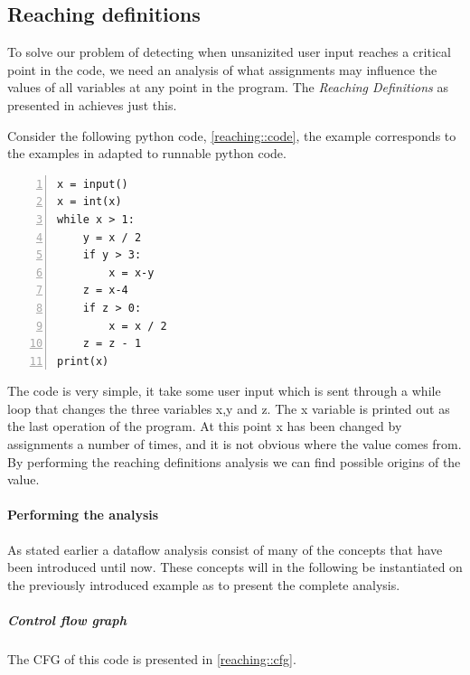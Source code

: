 \subsection{Reaching definitions}
To solve our problem of detecting when unsanizited user input reaches a critical point in the code, we need an analysis of what assignments may influence the values of all variables at any point in the program.
The \emph{Reaching Definitions} as presented in \citet[p.~26]{schwartzbach} achieves just this.

Consider the following python code, \cref{reaching::code}, the example corresponds to the examples in \citet{schwartzbach} adapted to runnable python code.

\begin{lstlisting}[caption={Code example from \citet{schwarzbach} translated to python code.}, label=reaching::code, numbers=left, frame=single, linewidth=6cm]
x = input()
x = int(x)
while x > 1:
    y = x / 2
    if y > 3:
        x = x-y
    z = x-4
    if z > 0:
        x = x / 2
    z = z - 1
print(x)
\end{lstlisting}

The code is very simple, it take some user input which is sent through a while loop that changes the three variables x,y and z.
The x variable is printed out as the last operation of the program.
At this point x has been changed by assignments a number of times, and it is not obvious where the value comes from.
By performing the reaching definitions analysis we can find possible origins of the value.

\paragraph{Performing the analysis}
As stated earlier a dataflow analysis consist of many of the concepts that have been introduced until now.
These concepts will in the following be instantiated on the previously introduced example as to present the complete analysis.

\subparagraph{Control flow graph}
The CFG of this code is presented in \cref{reaching::cfg}.


